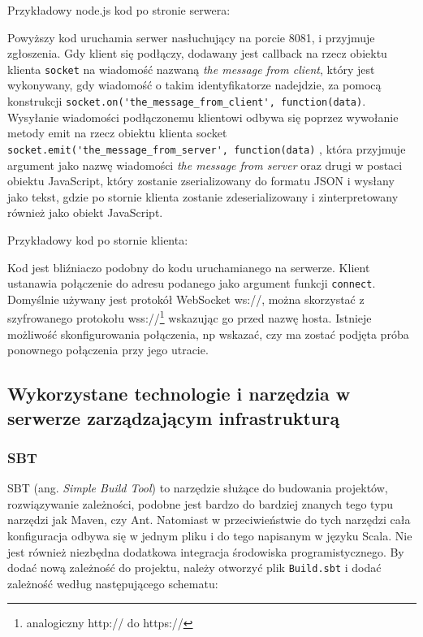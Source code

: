 Przykładowy node.js kod po stronie serwera:



Powyższy kod uruchamia serwer nasłuchujący na porcie 8081, i przyjmuje zgłoszenia. Gdy klient się podłączy, dodawany jest callback na rzecz obiektu klienta \lstinline{socket} na wiadomość nazwaną \emph{the message from client}, który jest wykonywany, gdy wiadomość o takim identyfikatorze nadejdzie, za pomocą konstrukcji \lstinline{socket.on('the_message_from_client', function(data)}. Wysyłanie wiadomości podłączonemu klientowi odbywa się poprzez wywołanie metody emit na rzecz obiektu klienta socket \lstinline{socket.emit('the_message_from_server', function(data)} , która przyjmuje argument jako nazwę wiadomości \emph{the message from server} oraz drugi w postaci obiektu JavaScript, który zostanie zserializowany do formatu JSON i wysłany jako tekst, gdzie po stornie klienta zostanie zdeserializowany i zinterpretowany również jako obiekt JavaScript.

Przykładowy kod po stornie klienta:



Kod jest bliźniaczo podobny do kodu uruchamianego na serwerze. Klient ustanawia połączenie do adresu podanego jako argument funkcji \lstinline{connect}. Domyślnie używany jest protokół WebSocket ws://, można skorzystać z szyfrowanego protokołu wss://\footnote{analogiczny http:// do https://} wskazując go przed nazwę hosta. Istnieje możliwość skonfigurowania połączenia, np wskazać, czy ma zostać podjęta próba ponownego połączenia przy jego utracie.


\subsection{Wykorzystane technologie i narzędzia w serwerze zarządzającym infrastrukturą}

\subsubsection{SBT}

SBT (ang. \emph{Simple Build Tool}) to narzędzie służące do budowania projektów, rozwiązywanie zależności, podobne jest bardzo do bardziej znanych tego typu narzędzi jak Maven, czy Ant. Natomiast w przeciwieństwie do tych narzędzi cała konfiguracja odbywa się w jednym pliku i do tego napisanym w języku Scala. Nie jest również niezbędna dodatkowa integracja środowiska programistycznego. By dodać nową zależność do projektu, należy otworzyć plik \lstinline|Build.sbt| i dodać zależność według następującego schematu:

